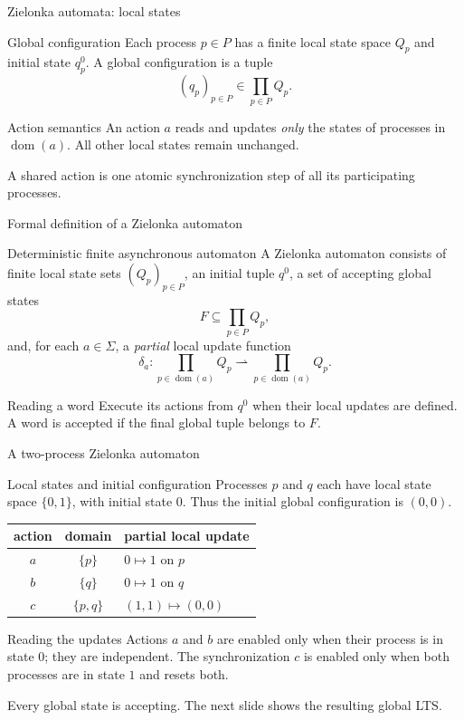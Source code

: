 \documentclass[t,11pt]{beamer}
\newcommand{\domn}{\operatorname{dom}}
\begin{document}
\begin{frame}{Zielonka automata: local states}
  \begin{block}{Global configuration}
    Each process $p\in P$ has a finite local state space $Q_p$ and initial state $q_p^0$. A global configuration is a tuple
    \[
        (q_p)_{p\in P}\in\prod_{p\in P}Q_p.
    \]
  \end{block}
  \begin{block}{Action semantics}
    An action $a$ reads and updates \emph{only} the states of processes in $\domn(a)$. All other local states remain unchanged.
  \end{block}
  \vspace{0.18cm}
  A shared action is one atomic synchronization step of all its participating processes.
\end{frame}

\begin{frame}{Formal definition of a Zielonka automaton}
  \begin{block}{Deterministic finite asynchronous automaton}
    A Zielonka automaton consists of finite local state sets $(Q_p)_{p\in P}$, an initial tuple $q^0$, a set of accepting global states
    \[
      F\subseteq\prod_{p\in P}Q_p,
    \]
    and, for each $a\in\Sigma$, a \emph{partial} local update function
    \[
      \delta_a:\prod_{p\in\domn(a)}Q_p
      \rightharpoonup\prod_{p\in\domn(a)}Q_p.
    \]
  \end{block}
  \begin{block}{Reading a word}
    Execute its actions from $q^0$ when their local updates are defined. A word is accepted if the final global tuple belongs to $F$.
  \end{block}
\end{frame}

\begin{frame}{A two-process Zielonka automaton}
  \begin{block}{Local states and initial configuration}
    Processes $p$ and $q$ each have local state space $\{0,1\}$, with initial state $0$.
    Thus the initial global configuration is $(0,0)$.
  \end{block}
  \begin{center}
  \begin{tabular}{c|c|l}
    action & domain & partial local update\\ \hline
    $a$ & $\{p\}$ & $0\mapsto1$ on $p$\\
    $b$ & $\{q\}$ & $0\mapsto1$ on $q$\\
    $c$ & $\{p,q\}$ & $(1,1)\mapsto(0,0)$
  \end{tabular}
  \end{center}
  \begin{block}{Reading the updates}
    Actions $a$ and $b$ are enabled only when their process is in state $0$; they are independent.
    The synchronization $c$ is enabled only when both processes are in state $1$ and resets both.
  \end{block}
  Every global state is accepting. The next slide shows the resulting global LTS.
\end{frame}
\end{document}
